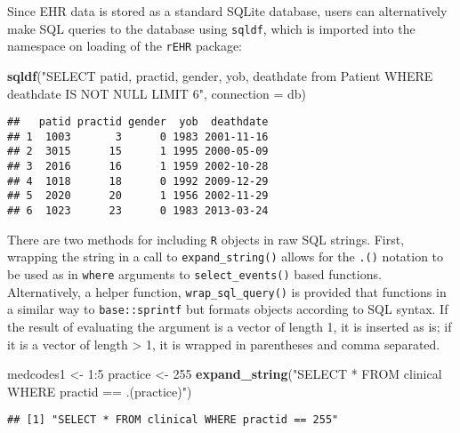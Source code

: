 \documentclass[]{article}
\newenvironment{Shaded}{\begin{snugshade}}{\end{snugshade}}
\newcommand{\KeywordTok}[1]{\textcolor[rgb]{0.13,0.29,0.53}{\textbf{{#1}}}}
\newcommand{\DataTypeTok}[1]{\textcolor[rgb]{0.13,0.29,0.53}{{#1}}}
\newcommand{\DecValTok}[1]{\textcolor[rgb]{0.00,0.00,0.81}{{#1}}}
\newcommand{\StringTok}[1]{\textcolor[rgb]{0.31,0.60,0.02}{{#1}}}
\newcommand{\NormalTok}[1]{{#1}}
\begin{document}
Since EHR data is stored as a standard SQLite database, users can
alternatively make SQL queries to the database using \texttt{sqldf},
which is imported into the namespace on loading of the \texttt{rEHR}
package:

\begin{Shaded}
\begin{Highlighting}[]
\KeywordTok{sqldf}\NormalTok{(}\StringTok{"SELECT patid, practid, gender, yob, deathdate from Patient WHERE }
\StringTok{          deathdate IS NOT NULL LIMIT 6"}\NormalTok{, }
      \DataTypeTok{connection =} \NormalTok{db)}
\end{Highlighting}
\end{Shaded}

\begin{verbatim}
##   patid practid gender  yob  deathdate
## 1  1003       3      0 1983 2001-11-16
## 2  3015      15      1 1995 2000-05-09
## 3  2016      16      1 1959 2002-10-28
## 4  1018      18      0 1992 2009-12-29
## 5  2020      20      1 1956 2002-11-29
## 6  1023      23      0 1983 2013-03-24
\end{verbatim}

There are two methods for including \texttt{R} objects in raw SQL
strings. First, wrapping the string in a call to
\texttt{expand\_string()} allows for the \texttt{.()} notation to be
used as in \texttt{where} arguments to \texttt{select\_events()} based
functions. Alternatively, a helper function, \texttt{wrap\_sql\_query()}
is provided that functions in a similar way to \texttt{base::sprintf}
but formats objects according to SQL syntax. If the result of evaluating
the argument is a vector of length 1, it is inserted as is; if it is a
vector of length \textgreater{} 1, it is wrapped in parentheses and
comma separated.

\begin{Shaded}
\begin{Highlighting}[]
\NormalTok{medcodes1 <-}\StringTok{ }\DecValTok{1}\NormalTok{:}\DecValTok{5}
\NormalTok{practice <-}\StringTok{ }\DecValTok{255}
\KeywordTok{expand_string}\NormalTok{(}\StringTok{"SELECT * FROM clinical WHERE practid == .(practice)"}\NormalTok{)}
\end{Highlighting}
\end{Shaded}

\begin{verbatim}
## [1] "SELECT * FROM clinical WHERE practid == 255"
\end{verbatim}

\begin{Shaded}
\end{Shaded}
\end{document}
